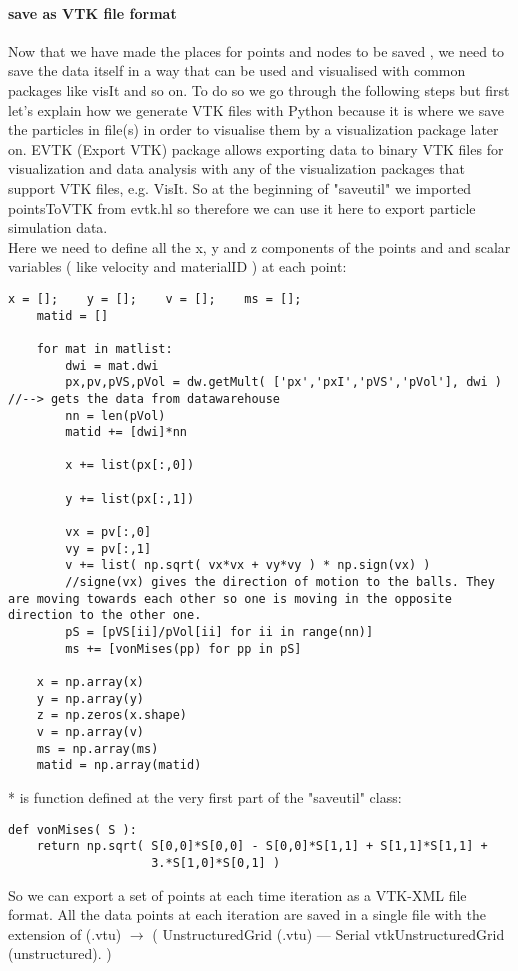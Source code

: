\documentclass[11pt,fleqn]{book} %
\begin{document}
\paragraph{save as VTK file format}
Now that we have made the places for points and nodes to be saved , we need to save the data itself in a way that can be used and visualised with common packages like visIt and so on. To do so we go through the following steps but first let's explain how we generate VTK files with Python because it is where we save the particles in file(s) in order to visualise them by a visualization package later on.
EVTK (Export VTK) package allows exporting data to binary VTK files for visualization and data analysis with any of the visualization packages that support VTK files, e.g. VisIt. So at the beginning of "saveutil" we imported pointsToVTK from evtk.hl so therefore we can use it here to export particle simulation data.\\
Here we need to define all the x, y and z components of the points and and scalar variables ( like velocity  and materialID ) at each point:
\begin{lstlisting}
x = [];	   y = [];    v = [];    ms = [];
	matid = []
	
	for mat in matlist:
	    dwi = mat.dwi
	    px,pv,pVS,pVol = dw.getMult( ['px','pxI','pVS','pVol'], dwi ) //--> gets the data from datawarehouse
	    nn = len(pVol)
	    matid += [dwi]*nn
	    
	    x += list(px[:,0])
            
	    y += list(px[:,1]) 
	
	    vx = pv[:,0]
	    vy = pv[:,1]
	    v += list( np.sqrt( vx*vx + vy*vy ) * np.sign(vx) )
	    //signe(vx) gives the direction of motion to the balls. They are moving towards each other so one is moving in the opposite direction to the other one.
	    pS = [pVS[ii]/pVol[ii] for ii in range(nn)]
	    ms += [vonMises(pp) for pp in pS]
	    
	x = np.array(x)
	y = np.array(y)
	z = np.zeros(x.shape)
	v = np.array(v)
	ms = np.array(ms)
	matid = np.array(matid)
\end{lstlisting}
* is function defined at the very first part of the "saveutil" class:
\begin{lstlisting}
def vonMises( S ):
    return np.sqrt( S[0,0]*S[0,0] - S[0,0]*S[1,1] + S[1,1]*S[1,1] +
                    3.*S[1,0]*S[0,1] )
\end{lstlisting}
So we can export a set of points at each time iteration as a VTK-XML file format. All the data points at each iteration are saved in a single file with the extension of (.vtu) $\rightarrow$ ( UnstructuredGrid (.vtu) — Serial vtkUnstructuredGrid (unstructured). )
\end{document}
